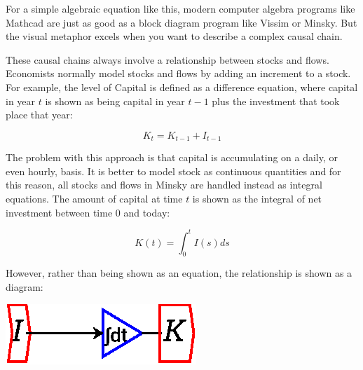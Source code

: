 \begin{center}
\end{center}

For a simple algebraic equation like this, modern computer algebra
programs like Mathcad are just as good as a block diagram program like
Vissim or Minsky. But the visual metaphor excels when you want to describe a
complex causal chain.


These causal chains always involve a relationship between stocks and
flows. Economists normally model stocks and flows by adding an
increment to a stock. For example, the level of Capital is defined as
a difference equation, where capital in year $t$ is shown as being 
capital in year $t-1$ plus the investment that took place that year:

\begin{displaymath}
K_t=K_{t-1}+I_{t-1}
\end{displaymath}

The problem with this approach is that capital is accumulating on a daily, 
or even hourly, basis. It is better to model stock as continuous quantities
and for this reason, all stocks and flows in Minsky are handled instead 
as integral equations. The amount of capital at time $t$ is shown as 
the integral of net investment between time 0 and today:

\begin{displaymath}
K(t)=\int_0^t I(s)ds
\end{displaymath}

However, rather than being shown as an equation, the relationship is shown as a diagram:

\begin{center}
\includegraphics{images/NewItem7.eps}
\end{center}

